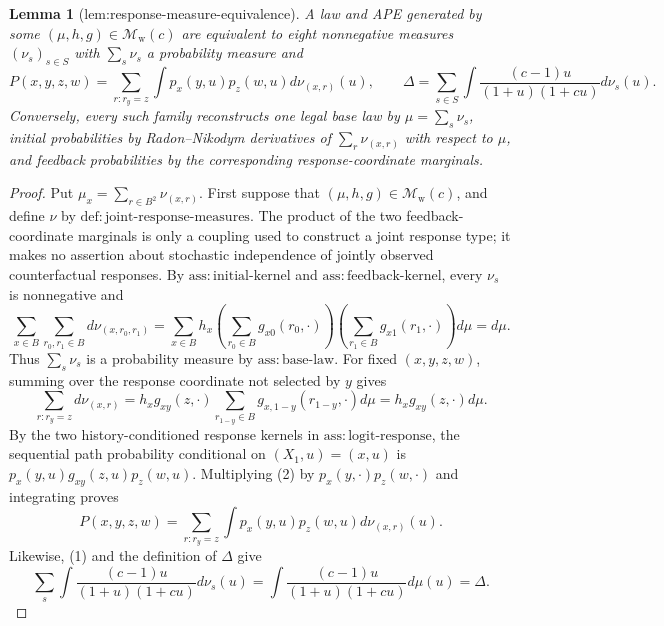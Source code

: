 \documentclass{article}
\newtheorem{lemma}{Lemma}
\begin{document}
\begin{lemma}[lem:response-measure-equivalence]\label{lem:response-measure-equivalence}
A law and APE generated by some \((\mu,h,g)\in\mathcal M_{\mathrm w}(c)\) are equivalent to eight nonnegative measures \((\nu_s)_{s\in S}\) with \(\sum_s\nu_s\) a probability measure and \[P(x,y,z,w)=\sum_{r:r_y=z}\int p_x(y,u)p_z(w,u)d\nu_{(x,r)}(u),\qquad \Delta=\sum_{s\in S}\int\frac{(c-1)u}{(1+u)(1+cu)}d\nu_s(u).\] Conversely, every such family reconstructs one legal base law by \(\mu=\sum_s\nu_s\), initial probabilities by Radon--Nikodym derivatives of \(\sum_r\nu_{(x,r)}\) with respect to \(\mu\), and feedback probabilities by the corresponding response-coordinate marginals.
\end{lemma}
\begin{proof}
Put \(\mu_x=\sum_{r\in B^2}\nu_{(x,r)}\).  First suppose that \((\mu,h,g)\in\mathcal M_{\mathrm w}(c)\), and define \(\nu\) by \(\mathrm{def{:}joint\text{-}response\text{-}measures}\).  The product of the two feedback-coordinate marginals is only a coupling used to construct a joint response type; it makes no assertion about stochastic independence of jointly observed counterfactual responses.  By \(\mathrm{ass{:}initial\text{-}kernel}\) and \(\mathrm{ass{:}feedback\text{-}kernel}\), every \(\nu_s\) is nonnegative and
\[
 \sum_{x\in B}\sum_{r_0,r_1\in B}d\nu_{(x,r_0,r_1)}
 =\sum_{x\in B}h_x
   \left(\sum_{r_0\in B}g_{x0}(r_0,\cdot)\right)
   \left(\sum_{r_1\in B}g_{x1}(r_1,\cdot)\right)d\mu
 =d\mu. \tag{1}
\]
Thus \(\sum_s\nu_s\) is a probability measure by \(\mathrm{ass{:}base\text{-}law}\).  For fixed \((x,y,z,w)\), summing over the response coordinate not selected by \(y\) gives
\[
 \sum_{r:r_y=z}d\nu_{(x,r)}
 =h_xg_{xy}(z,\cdot)
   \sum_{r_{1-y}\in B}g_{x,1-y}(r_{1-y},\cdot)d\mu
 =h_xg_{xy}(z,\cdot)d\mu. \tag{2}
\]
By the two history-conditioned response kernels in \(\mathrm{ass{:}logit\text{-}response}\), the sequential path probability conditional on \((X_1,u)=(x,u)\) is \(p_x(y,u)g_{xy}(z,u)p_z(w,u)\).  Multiplying (2) by \(p_x(y,\cdot)p_z(w,\cdot)\) and integrating proves
\[
 P(x,y,z,w)=\sum_{r:r_y=z}\int p_x(y,u)p_z(w,u)d\nu_{(x,r)}(u). \tag{3}
\]
Likewise, (1) and the definition of \(\Delta\) give
\[
 \sum_s\int\frac{(c-1)u}{(1+u)(1+cu)}d\nu_s(u)
 =\int\frac{(c-1)u}{(1+u)(1+cu)}d\mu(u)=\Delta. \tag{4}
\]


\end{proof}
\end{document}
